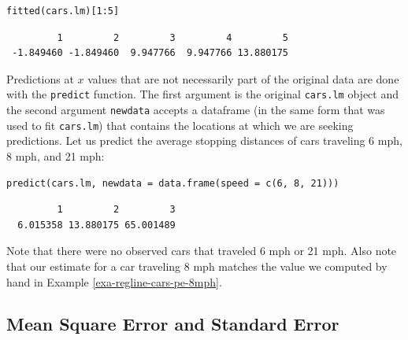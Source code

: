 \documentclass[captions=tableheading]{scrbook}
\begin{document}
\lstset{language=R}
\begin{lstlisting}
fitted(cars.lm)[1:5]
\end{lstlisting}

\begin{verbatim}
         1         2         3         4         5 
 -1.849460 -1.849460  9.947766  9.947766 13.880175
\end{verbatim}

Predictions at \(x\) values that are not necessarily part of the original data are done with the \texttt{predict} function. The first argument is the original \texttt{cars.lm} object and the second argument \texttt{newdata} accepts a dataframe (in the same form that was used to fit \texttt{cars.lm}) that contains the locations at which we are seeking predictions. Let us predict the average stopping distances of cars traveling 6 mph, 8 mph, and 21 mph:


\lstset{language=R}
\begin{lstlisting}
predict(cars.lm, newdata = data.frame(speed = c(6, 8, 21)))
\end{lstlisting}

\begin{verbatim}
         1         2         3 
  6.015358 13.880175 65.001489
\end{verbatim}

Note that there were no observed cars that traveled 6 mph or 21 mph. Also note that our estimate for a car traveling 8 mph matches the value we computed by hand in Example \ref{exa-regline-cars-pe-8mph}.
\subsection{Mean Square Error and Standard Error}
\label{sec-11-2-3}
\end{document}
